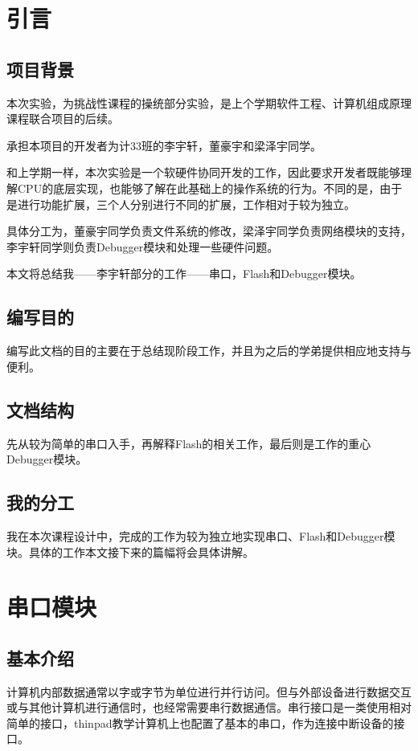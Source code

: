 \section{引言}

\subsection{项目背景}

本次实验，为挑战性课程的操统部分实验，是上个学期软件工程、计算机组成原理课程联合项目的后续。

承担本项目的开发者为计33班的李宇轩，董豪宇和梁泽宇同学。

和上学期一样，本次实验是一个软硬件协同开发的工作，因此要求开发者既能够理解CPU的底层实现，也能够了解在此基础上的操作系统的行为。不同的是，由于是进行功能扩展，三个人分别进行不同的扩展，工作相对于较为独立。

具体分工为，董豪宇同学负责文件系统的修改，梁泽宇同学负责网络模块的支持，李宇轩同学则负责Debugger模块和处理一些硬件问题。

本文将总结我——李宇轩部分的工作——串口，Flash和Debugger模块。

\subsection{编写目的}
编写此文档的目的主要在于总结现阶段工作，并且为之后的学弟提供相应地支持与便利。

\subsection{文档结构}
先从较为简单的串口入手，再解释Flash的相关工作，最后则是工作的重心Debugger模块。

\subsection{我的分工}
我在本次课程设计中，完成的工作为较为独立地实现串口、Flash和Debugger模块。具体的工作本文接下来的篇幅将会具体讲解。


\section{串口模块}
\subsection{基本介绍}
计算机内部数据通常以字或字节为单位进行并行访问。但与外部设备进行数据交互或与其他计算机进行通信时，也经常需要串行数据通信。串行接口是一类使用相对简单的接口，thinpad教学计算机上也配置了基本的串口，作为连接中断设备的接口。

